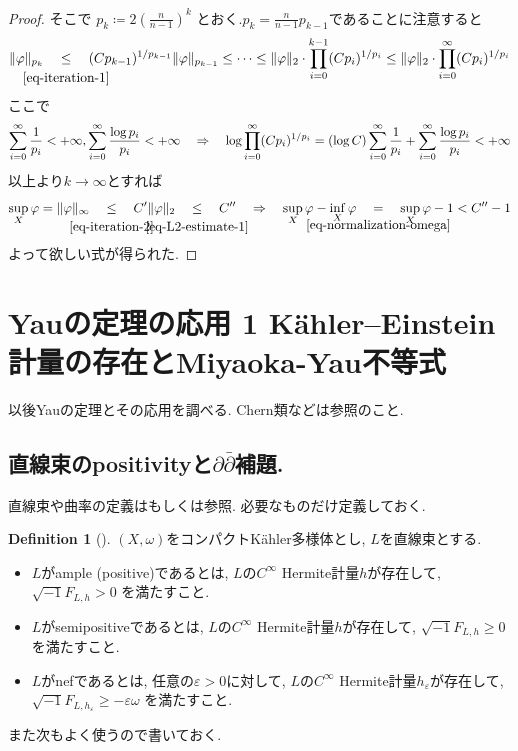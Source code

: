 \documentclass[dvipdfmx,a4paper,11pt]{article} %
\newtheorem{lem}[thm]{Lemma}
\theoremstyle{definition}
\newtheorem{defn}[thm]{Definition}
\theoremstyle{remark}
\numberwithin{equation}{section}
\newcommand{\underalign}[2]{%
  \quad
  \underset{\mathclap{\raisebox{-1.6ex}{\ensuremath{\scriptstyle #1}}}}{#2}
  \quad
}
\begin{document}
\begin{proof}
そこで
\(
p_k
\coloneqq 
2\left(
\frac{n}{n-1}
\right)^k 
\)
とおく.$p_k = \frac{n}{n-1}p_{k-1}$であることに注意すると
\begin{equation}
\label{eq-iteration-2}
\begin{aligned}
\lVert \varphi\rVert_{p_k}
\underalign{\eqref{eq-iteration-1}}{\leq}
(Cp_{k-1})^{1/p_{k-1}}
\lVert \varphi\rVert_{p_{k-1}}
\leq
\cdots\leq
\lVert \varphi\rVert_2\cdot
\prod_{i=0}^{k-1}
(Cp_i)^{1/p_i}
\leq
\lVert \varphi\rVert_2 \cdot
\prod_{i=0}^{\infty}
(Cp_i)^{1/p_i}
\end{aligned}
\end{equation}
ここで
\[
\sum_{i=0}^{\infty}\frac{1}{p_i}<+\infty, 
\sum_{i=0}^{\infty}\frac{\log p_i}{p_i}<+\infty
\underalign{}{\Rightarrow}
\log \prod_{i=0}^{\infty}
(Cp_i)^{1/p_i}
=
(\log C)\sum_{i=0}^{\infty}\frac1{p_i}
+
\sum_{i=0}^{\infty}\frac{\log p_i}{p_i}
<+\infty
\]
以上より$k\to\infty$とすれば
\[
\sup_X\varphi
=
\lVert \varphi\rVert_\infty
\underalign{\eqref{eq-iteration-2}}{\leq}
C'\lVert \varphi\rVert_2
\underalign{\eqref{eq-L2-estimate-1}}{\leq}
C''
\underalign{}{\Rightarrow}
\sup_X\varphi-\inf_X \varphi
\underalign{\eqref{eq-normalization-omega}}{=}\sup_X\varphi-1
<C''-1
\]
よって欲しい式が得られた.
\end{proof}


\newpage
\section{Yauの定理の応用 1 K\"ahler--Einstein計量の存在とMiyaoka-Yau不等式}
\label{sec-Yau-App1}
以後Yauの定理とその応用を調べる. Chern類などは\cite{Iwa-Chern}参照のこと.

\subsection{直線束のpositivityと$\partial \bar\partial$補題.}
直線束や曲率の定義は\cite[Section 3~5]{Dem12}もしくは\cite[Chapters 1 and 2]{Iwa-Chern}参照. 必要なものだけ定義しておく. 
\begin{defn}[{\cite[Section 5]{Dem12}}]
$(X, \omega)$をコンパクトK\"ahler多様体とし, $L$を直線束とする. 
\begin{itemize}
\item $L$がample (positive)であるとは, \(L\)の\(C^\infty\) Hermite計量\(h\)が存在して,
\(
 \sqrt{-1}F_{L,h}>0
\)
を満たすこと. 
\item $L$がsemipositiveであるとは, \(L\)の\(C^\infty\) Hermite計量\(h\)が存在して,
\(
 \sqrt{-1}F_{L,h}\geq 0
\)
を満たすこと. 
\item $L$がnefであるとは, 任意の\(\varepsilon>0\)に対して, \(L\)の\(C^\infty\) Hermite計量\(h_\varepsilon\)が存在して,
\(
 \sqrt{-1}F_{L,h_\varepsilon}\geq -\varepsilon\omega
\)
を満たすこと. 
\end{itemize}
\end{defn}
また次もよく使うので書いておく. 
\end{document}
